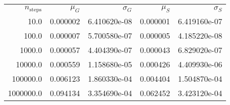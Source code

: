 \begin{tabular}{|r|r|r|r|r|}
    \hline
 $n_{\mathrm{steps}}$ &  $\mu_{G}$ &  $\sigma_{G}$ &  $\mu_{S}$ &  $\sigma_{S}$ \\
                10.0 &   0.000002 &  6.410620e-08 &   0.000001 &  6.419160e-07 \\
               100.0 &   0.000007 &  5.700580e-07 &   0.000005 &  4.185220e-08 \\
              1000.0 &   0.000057 &  4.404390e-07 &   0.000043 &  6.829020e-07 \\
             10000.0 &   0.000559 &  1.158680e-05 &   0.000426 &  4.409930e-06 \\
            100000.0 &   0.006123 &  1.860330e-04 &   0.004404 &  1.504870e-04 \\
           1000000.0 &   0.094134 &  3.354690e-04 &   0.062452 &  3.423120e-04 \\
    \hline
\end{tabular}
